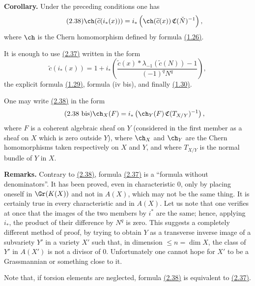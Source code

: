 \textbf{Corollary.} Under the preceding conditions one has
\begin{equation}\tag{2.38}
 \ch(\widetilde c(i_*(x)))=i_*\left(\ch(\widetilde c(x))\,\mathfrak C(\check N)^{-1}\right),
\end{equation}
where $\ch$ is the Chern homomorphism defined by formula \hyperlink{sga6.e00.eq.1-26}{(1.26)}.

It is enough to use \hyperlink{sga6.e00.eq.2-37}{(2.37)} written in the form
\begin{equation}\tag{2.37 bis}
 \widetilde c(i_*(x))=1+i_*\left(\frac{\widetilde c(x)*\lambda_{-1}(\widetilde c(N))-1}{(-1)^qN^q}\right),
\end{equation}
the explicit formula \hyperlink{sga6.e00.eq.1-29}{(1.29)}, formula (iv bis), and finally \hyperlink{sga6.e00.eq.1-30}{(1.30)}.

One may write \hyperlink{sga6.e00.eq.2-38}{(2.38)} in the form
\begin{equation}\tag{2.38 bis}
 \ch_X(F)=i_*\left(\ch_Y(F)\,\mathfrak C(T_{X/Y})^{-1}\right),
\end{equation}
where $F$ is a coherent algebraic sheaf on $Y$ (considered in the first member as a sheaf on $X$ which is zero outside $Y$), where $\ch_X$ and $\ch_Y$ are the Chern homomorphisms taken respectively on $X$ and $Y$, and where $T_{X/Y}$ is the normal bundle of $Y$ in $X$.

\textbf{Remarks.} Contrary to \hyperlink{sga6.e00.eq.2-38}{(2.38)}, formula \hyperlink{sga6.e00.eq.2-37}{(2.37)} is a ``formula without denominators''. It has been proved, even in characteristic $0$, only by placing oneself in $\Gr(K(X))$ and not in $A(X)$, which may not be the same thing. It is certainly true in every characteristic and in $A(X)$. Let us note that one verifies at once that the images of the two members by $i^*$ are the same; hence, applying $i_*$, the product of their difference by $N^q$ is zero. This suggests a completely different method of proof, by trying to obtain $Y$ as a transverse inverse image of a subvariety $Y'$ in a variety $X'$ such that, in dimension $\leq n=\dim X$, the class of $Y'$ in $A(X')$ is not a divisor of $0$. Unfortunately one cannot hope for $X'$ to be a Grassmannian or something close to it.

Note that, if torsion elements are neglected, formula \hyperlink{sga6.e00.eq.2-38}{(2.38)} is equivalent to \hyperlink{sga6.e00.eq.2-37}{(2.37)}.




